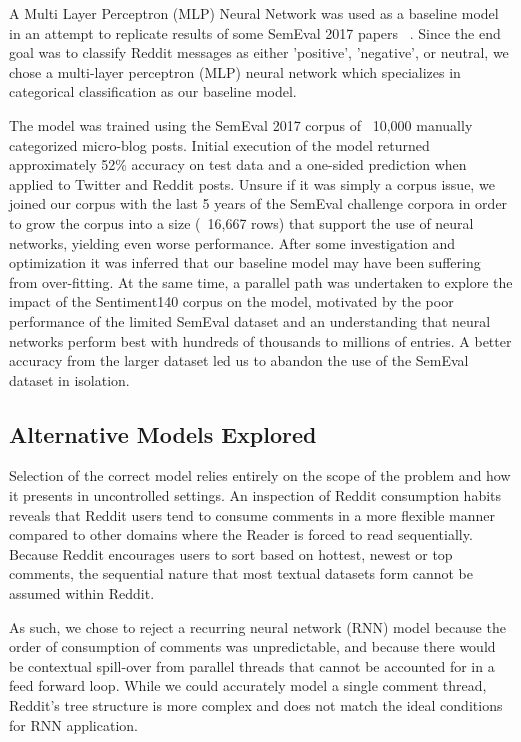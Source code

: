 \documentclass[11pt]{article}
\begin{document}
A Multi Layer Perceptron (MLP) Neural Network was used as a baseline model in an attempt to 
replicate results of some SemEval 2017 papers ~\cite{agarwol:11}. Since the end goal was to classify 
Reddit messages as either 'positive', 'negative', or neutral, we chose a multi-layer perceptron (MLP) 
neural network which specializes in categorical classification as our baseline model.

The model was trained using the SemEval 2017 corpus of ~10,000 manually 
categorized micro-blog posts. Initial execution of the model returned approximately 
52\% accuracy on test data and a one-sided prediction when applied to Twitter and 
Reddit posts. Unsure if it was simply a corpus issue, we joined our corpus with the 
last 5 years of the SemEval challenge corpora in order to grow the 
corpus into a size (~16,667 rows) that support the use of neural networks, 
yielding even worse performance. After some investigation and optimization it was 
inferred that our baseline model may have been suffering from over-fitting. At the 
same time, a parallel path was undertaken to explore the impact of the Sentiment140 
corpus on the model, motivated by the poor performance of the limited SemEval dataset 
and an understanding that neural networks perform best with hundreds of thousands to 
millions of entries. A better accuracy from the larger dataset led us to abandon the 
use of the SemEval dataset in isolation. 

\subsection{Alternative Models Explored}

Selection of the correct model relies entirely on the scope of the problem and how it 
presents in uncontrolled settings. An inspection of Reddit consumption habits reveals 
that Reddit users tend to consume comments in a more flexible manner compared to other 
domains where the Reader is forced to read sequentially. Because Reddit encourages 
users to sort based on hottest, newest or top comments, the sequential nature that most 
textual datasets form cannot be assumed within Reddit.  

As such, we chose to reject a recurring neural network 
(RNN) model because the order of consumption of comments was 
unpredictable, and because there would be contextual spill-over from parallel threads that 
cannot be accounted for in a feed forward loop. While we could accurately model a single 
comment thread, Reddit's tree structure is more complex and does not
match the ideal conditions for RNN application.
\end{document}
